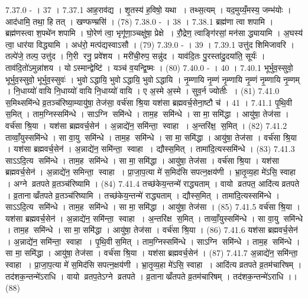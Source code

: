 7.37.0
- । 37 ।
7.37.1
आह॒राव॑द्य । शृ॒तस्य॑ ह॒विषो॒ यथा । तथ्स॒त्यम् । यद॒मुय्यँ॒मस्य॒ जम्भ॑योः । आद॑धामि॒ तथा॒ हि तत् । खण्फण्म्रसि॑ । (78)
7.38.0
- । 38 ।
7.38.1
ब्रह्म॑णा त्वा शपामि । ब्रह्म॑णस्त्वा श॒पथे॑न शपामि । घो॒रेण॑ त्वा॒ भृगू॑णा॒ञ्चक्षु॑षा॒ प्रेक्षे । रौ॒द्रेण॒ त्वाङ्गि॑रसां॒ मन॑सा द्ध्यायामि । अ॒घस्य॑ त्वा॒ धार॑या विद्ध्यामि । अध॑रो॒ मत्प॑द्यस्वाऽसौ । (79)
7.39.0
- । 39 ।
7.39.1
उत्तु॑द शिमिजावरि । तल्पे॑जे॒ तल्प॒ उत्तु॑द । गि॒री रनु॒ प्रवे॑शय । मरी॑ची॒रुप॒ सन्नु॑द । याव॑दि॒तः पु॒रस्ता॑दु॒दया॑ति॒ सूर्यः॑ । ताव॑दि॒तो॑ऽमुन्ना॑शय । योऽस्मान्द्वेष्टि॑ । यञ्च॑ व॒यन्द्वि॒ष्मः । (80)
7.40.0
- । 40 ।
7.40.1
भूर्भुव॒स्सुवो॒ भूर्भुव॒स्सुवो॒ भूर्भुव॒स्सुवः॑ । भुवोऽद्धायि॒ भुवोऽद्धायि॒ भुवोऽद्धायि । नृ॒म्णायि नृ॒म्णं नृ॒म्णायि नृ॒म्णं नृ॒म्णायि नृ॒म्णम् । नि॒धाय्यो॑ वायि नि॒धाय्यो॑ वायि नि॒धाय्यो॑ वायि । ए अ॒स्मे अ॒स्मे । सुव॒र्न ज्योतीः । (81)
7.41.0
स॒मिथ्समि॑न्धे व्र॒तञ्च॑रिष्या॒म्यायु॑षा॒ तेज॑सा॒ वर्च॑सा श्रि॒या यश॑सा ब्रह्मवर्च॒सेना॒ष्टौ च॑ । 41 ।
7.41.1
पृ॒थि॒वी स॒मित् । ताम॒ग्निस्समि॑न्धे । साऽग्नि समि॑न्धे । ताम॒ह समि॑न्धे । सा मा॒ समि॑द्धा । आयु॑षा॒ तेज॑सा । वर्च॑सा श्रि॒या । यश॑सा ब्रह्मवर्च॒सेन॑ । अ॒न्नाद्ये॑न॒ समि॑न्ता॒॒ स्वाहा । अ॒न्तरि॑क्ष॒॒ स॒मित् । (82)
7.41.2
ताव्वाँ॒युस्समि॑न्धे । सा वा॒यु समि॑न्धे । ताम॒ह समि॑न्धे । सा मा॒ समि॑द्धा । आयु॑षा॒ तेज॑सा । वर्च॑सा श्रि॒या । यश॑सा ब्रह्मवर्च॒सेन॑ । अ॒न्नाद्ये॑न॒ समि॑न्ता॒॒ स्वाहा । द्यौस्स॒मित् । तामा॑दि॒त्यस्समि॑न्धे । (83)
7.41.3
साऽऽदि॒त्य समि॑न्धे । ताम॒ह समि॑न्धे । सा मा॒ समि॑द्धा । आयु॑षा॒ तेज॑सा । वर्च॑सा श्रि॒या । यश॑सा ब्रह्मवर्च॒सेन॑ । अ॒न्नाद्ये॑न॒ समिन्ता॒॒ स्वाहा । प्रा॒जा॒प॒त्या मे॑ स॒मिद॑सि सपत्न॒क्षय॑णी । भ्रा॒तृ॒व्य॒हा मे॑ऽसि॒ स्वाहा । अग्ने व्रतपते व्र॒तञ्च॑रिष्यामि । (84)
7.41.4
तच्छ॑केय॒न्तन्मे॑ राद्ध्यताम् । वायो व्रतपत॒ आदि॑त्य व्रतपते । व्र॒तानाव्व्रँतपते व्र॒तञ्च॑रिष्यामि । तच्छ॑केय॒न्तन्मे॑ राद्ध्यताम् । द्यौस्स॒मित् । तामा॑दि॒त्यस्समि॑न्धे । साऽऽदि॒त्य समि॑न्धे । ताम॒ह समि॑न्धे । सा मा॒ समि॑द्धा । आयु॑षा॒ तेज॑सा । (85)
7.41.5
वर्च॑सा श्रि॒या । यश॑सा ब्रह्मवर्च॒सेन॑ । अ॒न्नाद्ये॑न॒ समि॑न्ता॒॒ स्वाहा । अ॒न्तरि॑क्ष स॒मित् । ताव्वाँ॒युस्समि॑न्धे । सा वा॒यु समि॑न्धे । ताम॒ह समि॑न्धे । सा मा॒ समि॑द्धा । आयु॑षा॒ तेज॑सा । वर्च॑सा श्रि॒या । (86)
7.41.6
यश॑सा ब्रह्मवर्च॒सेन॑ । अ॒न्नाद्ये॑न॒ समि॑न्ता॒॒ स्वाहा । पृ॒थि॒वी स॒मित् । ताम॒ग्निस्समि॑न्धे । साऽग्नि समि॑न्धे । ताम॒ह समि॑न्धे । सा मा॒ समि॑द्धा । आयु॑षा॒ तेज॑सा । वर्च॑सा श्रि॒या । यश॑सा ब्रह्मवर्च॒सेन॑ । (87)
7.41.7
अ॒न्नाद्ये॑न॒ समि॑न्ता॒॒ स्वाहा । प्रा॒जा॒प॒त्या मे॑ स॒मिद॑सि सपत्न॒क्षय॑णी । भ्रा॒तृ॒व्य॒हा मे॑ऽसि॒ स्वाहा । आदि॑त्य व्रतपते व्र॒तम॑चारिषम् । तद॑शक॒न्तन्मे॑ऽराधि । वायो व्रतप॒तेऽग्ने व्रतपते । व्र॒तानाव्व्रँतपते व्र॒तम॑चारिषम् । तद॑शक॒न्तन्मे॑ऽराधि ।। (88)
